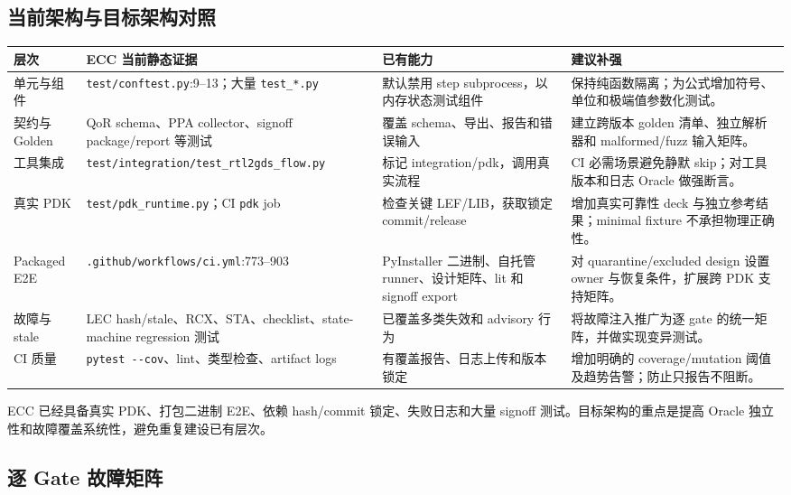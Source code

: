 \documentclass[UTF8,a4paper,11pt,fontset=fandol]{ctexart}
\numberwithin{equation}{section}
\newcommand{\code}[1]{\nolinkurl{#1}}
\begin{document}
\subsection{当前架构与目标架构对照}

\begin{center}
\begin{tabularx}{\textwidth}{p{}p{}p{}X}
\toprule
层次 & ECC 当前静态证据 & 已有能力 & 建议补强 \\
\midrule
单元与组件 & \code{test/conftest.py}:9--13；大量 \code{test_*.py} & 默认禁用 step subprocess，以内存状态测试组件 & 保持纯函数隔离；为公式增加符号、单位和极端值参数化测试。 \\
契约与 Golden & QoR schema、PPA collector、signoff package/report 等测试 & 覆盖 schema、导出、报告和错误输入 & 建立跨版本 golden 清单、独立解析器和 malformed/fuzz 输入矩阵。 \\
工具集成 & \code{test/integration/test_rtl2gds_flow.py} & 标记 integration/pdk，调用真实流程 & CI 必需场景避免静默 skip；对工具版本和日志 Oracle 做强断言。 \\
真实 PDK & \code{test/pdk_runtime.py}；CI \code{pdk} job & 检查关键 LEF/LIB，获取锁定 commit/release & 增加真实可靠性 deck 与独立参考结果；minimal fixture 不承担物理正确性。 \\
Packaged E2E & \code{.github/workflows/ci.yml}:773--903 & PyInstaller 二进制、自托管 runner、设计矩阵、lit 和 signoff export & 对 quarantine/excluded design 设置 owner 与恢复条件，扩展跨 PDK 支持矩阵。 \\
故障与 stale & LEC hash/stale、RCX、STA、checklist、state-machine regression 测试 & 已覆盖多类失效和 advisory 行为 & 将故障注入推广为逐 gate 的统一矩阵，并做实现变异测试。 \\
CI 质量 & \code{pytest --cov}、lint、类型检查、artifact logs & 有覆盖报告、日志上传和版本锁定 & 增加明确的 coverage/mutation 阈值及趋势告警；防止只报告不阻断。 \\
\bottomrule
\end{tabularx}
\end{center}

ECC 已经具备真实 PDK、打包二进制 E2E、依赖 hash/commit 锁定、失败日志和大量 signoff 测试。目标架构的重点是提高 Oracle 独立性和故障覆盖系统性，避免重复建设已有层次。

\subsection{逐 Gate 故障矩阵}
\end{document}

